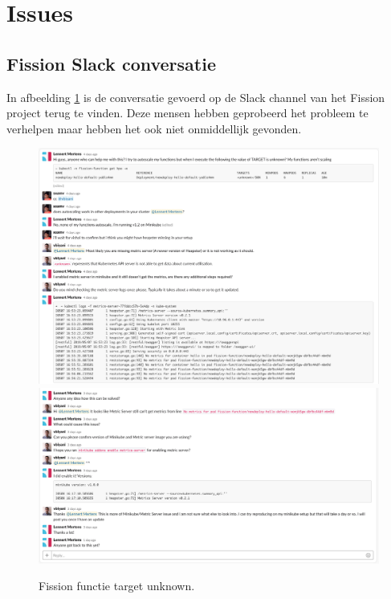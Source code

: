 \section{Issues}
\subsection{Fission Slack conversatie}
\label{sec:fission-slack-issue}
In afbeelding \ref{fig:fission-slack-issue-1} is de conversatie gevoerd op de Slack channel van het Fission project terug te vinden. Deze mensen hebben geprobeerd het probleem te verhelpen maar hebben het ook niet onmiddellijk gevonden.
\begin{figure}
    \includegraphics[width=1\textwidth]{img/fission-slack-issue-1.png}
     \includegraphics[width=1\textwidth]{img/fission-slack-issue-2.png}
    \caption{Fission functie target unknown.}
    \label{fig:fission-slack-issue-1}  
\end{figure}

